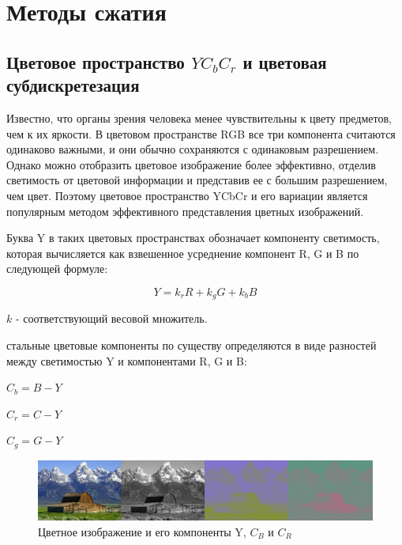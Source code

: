 \section*{Методы сжатия}

\subsection*{Цветовое пространство $YC_bC_r$ и цветовая субдискретезация}

Известно, что органы зрения человека менее чувствительны к цвету предметов, чем к их яркости. В цветовом пространстве RGB все три компонента считаются одинаково важными, и они обычно сохраняются с одинаковым разрешением. Однако можно отобразить цветовое изображение более эффективно, отделив светимость от цветовой информации и представив ее с большим разрешением, чем цвет. Поэтому цветовое пространство YCbCr и его вариации является популярным методом эффективного представления цветных изображений. 

Буква Y в таких цветовых пространствах обозначает компоненту светимость, которая вычисляется как взвешенное усреднение компонент R, G и B по следующей формуле: 

\begin{displaymath}
	Y = k_rR + k_gG + k_bB
\end{displaymath}

$k$ - соответствующий весовой множитель.

стальные цветовые компоненты по существу определяются в виде разностей между светимостью Y и компонентами R, G и B: 

\begin{center}
	$C_b = B - Y$ 

	$C_r = C - Y$ 

	$C_g = G - Y$ 
\end{center}

\begin{figure}[H]
	\begin{center}
		\includegraphics[scale=0.35]{pics/YCbCr/YCbCr_separation_h.jpg}
		\caption{Цветное изображение и его компоненты Y, $C_B$ и $C_R$} 
		\label{pic:YCbCr}
	\end{center}
\end{figure}

